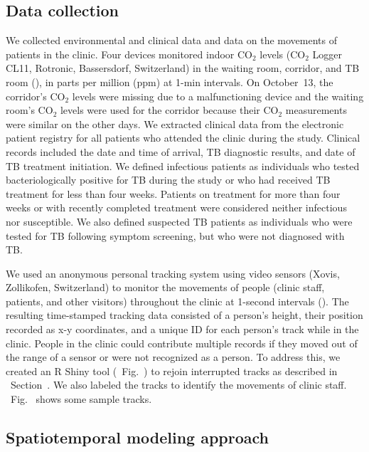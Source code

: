 \documentclass[fleqn,11pt]{wlscirep}
\begin{document}
\subsection*{Data collection}

We collected environmental and clinical data and data on the movements of patients in the clinic. Four devices monitored indoor CO$_2$ levels (CO$_2$ Logger CL11, Rotronic, Bassersdorf, Switzerland) in the waiting room, corridor, and TB room (), in parts per million (ppm) at 1-min intervals. On October~13, the corridor's CO$_2$ levels were missing due to a malfunctioning device and the waiting room's CO$_2$ levels were used for the corridor because their CO$_2$ measurements were similar on the other days.    
We extracted clinical data from the electronic patient registry for all patients who attended the clinic during the study. Clinical records included the date and time of arrival, TB diagnostic results, and date of TB treatment initiation. We defined infectious patients as individuals who tested bacteriologically positive for TB during the study or who had received TB treatment for less than four weeks. Patients on treatment for more than four weeks or with recently completed treatment were considered neither infectious nor susceptible. We also defined suspected TB patients as individuals who were tested for TB following symptom screening, but who were not diagnosed with TB. 

We used an anonymous personal tracking system using video sensors (Xovis, Zollikofen, Switzerland) to monitor the movements of people (clinic staff, patients, and other visitors) throughout the clinic at 1-second intervals (). The resulting time-stamped tracking data consisted of a person’s height, their position recorded as x-y coordinates, and a unique ID for each person's track while in the clinic. People in the clinic could contribute multiple records if they moved out of the range of a sensor or were not recognized as a person. To address this, we created an R Shiny tool (\supp~Fig.~) to rejoin interrupted tracks as described in \supp~Section~. We also labeled the tracks to identify the movements of clinic staff. \supp~Fig.~ shows some sample tracks.  


\subsection*{Spatiotemporal modeling approach}
\end{document}
